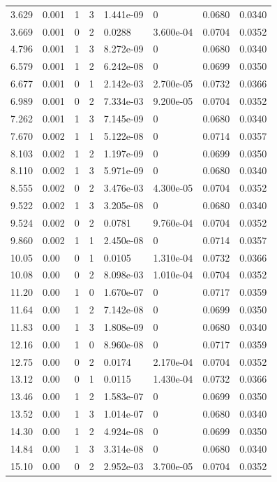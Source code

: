 \documentclass[preview]{standalone}
\begin{document}
{{\begin{tabular}{L{1.2cm}C{1.2cm} C{0.3cm}C{0.5cm} C{1.4cm}C{1.4cm} C{1.4cm}C{1.4cm}}
  3.629  &  0.001  & 1     &  3 &  1.441e-09  & 0  & 0.0680 &  0.0340   \\ 
  3.669  &  0.001  & 0     &  2 &  0.0288  & 3.600e-04  & 0.0704 &  0.0352   \\ 
  4.796  &  0.001  & 1     &  3 &  8.272e-09  & 0  & 0.0680 &  0.0340   \\ 
  6.579  &  0.001  & 1     &  2 &  6.242e-08  & 0  & 0.0699 &  0.0350   \\ 
  6.677  &  0.001  & 0     &  1 &  2.142e-03  & 2.700e-05  & 0.0732 &  0.0366   \\ 
  6.989  &  0.001  & 0     &  2 &  7.334e-03  & 9.200e-05  & 0.0704 &  0.0352   \\ 
  7.262  &  0.001  & 1     &  3 &  7.145e-09  & 0  & 0.0680 &  0.0340   \\ 
  7.670  &  0.002  & 1     &  1 &  5.122e-08  & 0  & 0.0714 &  0.0357   \\ 
  8.103  &  0.002  & 1     &  2 &  1.197e-09  & 0  & 0.0699 &  0.0350   \\ 
  8.110  &  0.002  & 1     &  3 &  5.971e-09  & 0  & 0.0680 &  0.0340   \\ 
  8.555  &  0.002  & 0     &  2 &  3.476e-03  & 4.300e-05  & 0.0704 &  0.0352   \\ 
  9.522  &  0.002  & 1     &  3 &  3.205e-08  & 0  & 0.0680 &  0.0340   \\ 
  9.524  &  0.002  & 0     &  2 &  0.0781  & 9.760e-04  & 0.0704 &  0.0352   \\ 
  9.860  &  0.002  & 1     &  1 &  2.450e-08  & 0  & 0.0714 &  0.0357   \\ 
  10.05  &  0.00  & 0     &  1 &  0.0105  & 1.310e-04  & 0.0732 &  0.0366   \\ 
  10.08  &  0.00  & 0     &  2 &  8.098e-03  & 1.010e-04  & 0.0704 &  0.0352   \\ 
  11.20  &  0.00  & 1     &  0 &  1.670e-07  & 0  & 0.0717 &  0.0359   \\ 
  11.64  &  0.00  & 1     &  2 &  7.142e-08  & 0  & 0.0699 &  0.0350   \\ 
  11.83  &  0.00  & 1     &  3 &  1.808e-09  & 0  & 0.0680 &  0.0340   \\ 
  12.16  &  0.00  & 1     &  0 &  8.960e-08  & 0  & 0.0717 &  0.0359   \\ 
  12.75  &  0.00  & 0     &  2 &  0.0174  & 2.170e-04  & 0.0704 &  0.0352   \\ 
  13.12  &  0.00  & 0     &  1 &  0.0115  & 1.430e-04  & 0.0732 &  0.0366   \\ 
  13.46  &  0.00  & 1     &  2 &  1.583e-07  & 0  & 0.0699 &  0.0350   \\ 
  13.52  &  0.00  & 1     &  3 &  1.014e-07  & 0  & 0.0680 &  0.0340   \\ 
  14.30  &  0.00  & 1     &  2 &  4.924e-08  & 0  & 0.0699 &  0.0350   \\ 
  14.84  &  0.00  & 1     &  3 &  3.314e-08  & 0  & 0.0680 &  0.0340   \\ 
  15.10  &  0.00  & 0     &  2 &  2.952e-03  & 3.700e-05  & 0.0704 &  0.0352   \\ 
\hline 
\end{tabular} 

}}
\end{document}
